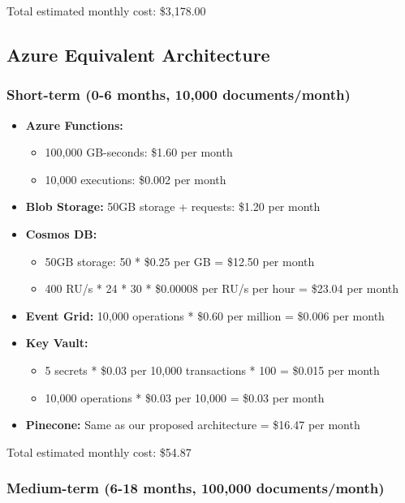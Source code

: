 \documentclass[a4paper, 12pt]{report}
\begin{document}
Total estimated monthly cost: \$3,178.00

\subsection{Azure Equivalent Architecture}

\subsubsection{Short-term (0-6 months, 10,000 documents/month)}

\begin{itemize}
    \item \textbf{Azure Functions:} 
        \begin{itemize}
            \item 100,000 GB-seconds: \$1.60 per month
            \item 10,000 executions: \$0.002 per month
        \end{itemize}
    \item \textbf{Blob Storage:} 50GB storage + requests: \$1.20 per month
    \item \textbf{Cosmos DB:} 
        \begin{itemize}
            \item 50GB storage: 50 * \$0.25 per GB = \$12.50 per month
            \item 400 RU/s * 24 * 30 * \$0.00008 per RU/s per hour = \$23.04 per month
        \end{itemize}
    \item \textbf{Event Grid:} 10,000 operations * \$0.60 per million = \$0.006 per month
    \item \textbf{Key Vault:} 
        \begin{itemize}
            \item 5 secrets * \$0.03 per 10,000 transactions * 100 = \$0.015 per month
            \item 10,000 operations * \$0.03 per 10,000 = \$0.03 per month
        \end{itemize}
    \item \textbf{Pinecone:} Same as our proposed architecture = \$16.47 per month
\end{itemize}

Total estimated monthly cost: \$54.87

\subsubsection{Medium-term (6-18 months, 100,000 documents/month)}
\end{document}
